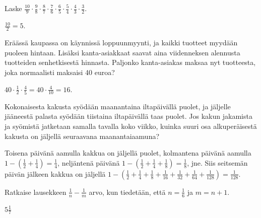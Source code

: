 \begin{tehtavasivu}
    \begin{tehtava}
        Laske 
        $\frac{10}{9}\cdot \frac{9}{8}\cdot \frac{8}{7}\cdot \frac{7}{6}\cdot \frac{6}{5}
            \cdot \frac{5}{4}\cdot \frac{4}{3}\cdot \frac{3}{2}$.
        
        \begin{vastaus}
            $\frac{10}{2}=5$.
        \end{vastaus}        
    \end{tehtava}
    
    \begin{tehtava}
    	Eräässä kaupassa on käynnissä loppuunmyynti, ja kaikki tuotteet
        myydään puoleen hintaan. Lisäksi kanta-asiakkaat saavat aina
        viidenneksen alennusta tuotteiden senhetkisestä hinnasta.
    	Paljonko kanta-asiakas maksaa nyt tuotteesta, joka normaalisti
        maksaisi 40 euroa?
    	\begin{vastaus}
    	$40\cdot \frac{1}{2} \cdot \frac{4}{5}=40\cdot \frac{4}{10}= 16$. 
    	\end{vastaus}
    \end{tehtava}
    
    \begin{tehtava}
        Kokonaisesta kakusta syödään maanantaina iltapäivällä puolet, ja jäljelle
        jääneestä palasta syödään tiistaina iltapäivällä taas puolet.
        Jos kakun jakamista ja syömistä jatketaan samalla tavalla koko viikko,
        kuinka suuri osa alkuperäisestä kakusta on
        jäljellä seuraavana maanantaiaamuna?
        
        \begin{vastaus}
            Toisena päivänä aamulla kakkua on jäljellä puolet, kolmantena
            päivänä aamulla
                $1-\left(\frac{1}{2} + \frac{1}{4}\right) = \frac{1}{4}$, 
            neljäntenä päivänä
                $1-\left(\frac{1}{2} + \frac{1}{4} + \frac{1}{8}\right)
                = \frac{1}{8}$, jne.
            Siis seitsemän päivän jälkeen kakkua on jäljellä
                $1-\left(\frac{1}{2} + \frac{1}{4} + \frac{1}{8} +
                \frac{1}{16} + \frac{1}{32} + \frac{1}{64} + \frac{1}{128}\right)
                = \frac{1}{128}$.  
        \end{vastaus}
    \end{tehtava}

    \begin{tehtava} %
Ratkaise lausekkeen $\frac{1}{n}-\frac{1}{m}$ arvo, kun tiedetään, että $n = \frac{1}{6}$ ja $m=n+1$.
        \begin{vastaus}
            $5 \frac{1}{7}$
        \end{vastaus}
    \end{tehtava}


\end{tehtavasivu}
